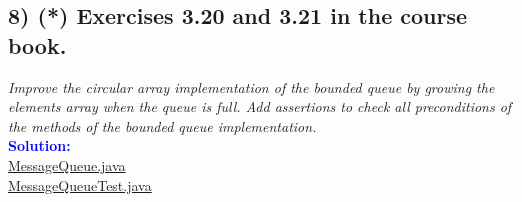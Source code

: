 \documentclass{article}
\begin{document}
\subsection*{8) (*) Exercises 3.20 and 3.21 in the course book.}
\hypertarget{E8}{ }
\textit{Improve the circular array implementation of the
bounded queue by growing the elements array when the queue is full. Add assertions to check
all preconditions of the methods of the bounded queue implementation.}\\
\indent \textbf{\textcolor{blue}{Solution:}} \\
\hyperlink{MessageQueue}{MessageQueue.java}\\
\hyperlink{MessageQueueTest}{MessageQueueTest.java}


\newpage

\end{document}
